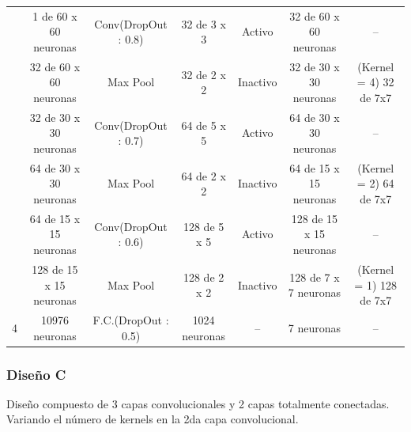 \begin{itemize}
\begin{table}[H]
\begin{center}
\begin{tabular}{|>{\scriptsize}c|>{\scriptsize}c>{\scriptsize}c>{\scriptsize}c>{\scriptsize}c>{\scriptsize}c|>{\scriptsize}c|}
				 & 1 de 60 x 60 neuronas & Conv(DropOut : 0.8) & 32 de 3 x 3 & Activo & 32 de 60 x 60 neuronas & --\\ 
				\multirow{-2}{*}{1} &  32 de 60 x 60 neuronas &  Max Pool &  32 de 2 x 2 &  Inactivo & 32 de 30 x 30 neuronas & {\cellcolor[HTML]{DAE8FC}(Kernel = 4) 32 de 7x7}\\ \hline
				 & 32 de 30 x 30 neuronas & Conv(DropOut : 0.7) & 64 de 5 x 5 & Activo & 64 de 30 x 30 neuronas & --\\ 
				\multirow{-2}{*}{2} &  64 de 30 x 30 neuronas &  Max Pool &  64 de 2 x 2 &  Inactivo & 64 de 15 x 15 neuronas & {\cellcolor[HTML]{DAE8FC}(Kernel = 2) 64 de 7x7}\\ \hline			
				{\cellcolor[HTML]{ffb3b3}} & 64 de 15 x 15 neuronas & Conv(DropOut : 0.6) & 128 de 5 x 5 & Activo & 128 de 15 x 15 neuronas & --\\ 			
				{\cellcolor[HTML]{ffb3b3} \multirow{-2}{*}{3}} &  128 de 15 x 15 neuronas &  Max Pool &  128 de 2 x 2 &  Inactivo & 128 de 7 x 7 neuronas & {\cellcolor[HTML]{DAE8FC} (Kernel = 1) 128 de 7x7 }\\ \hline
				4 &  {\cellcolor[HTML]{DAE8FC}10976 neuronas} &  F.C.(DropOut : 0.5) &  1024 neuronas &  -- & 7 neuronas & --\\ \hline
				\end{tabular}
				\end{center}
				\end{table}

				\end{itemize}
		\vspace{2.2em}
		\subsubsection{Diseño C} %
			\vspace{-1.2em}
			Diseño compuesto de 3 capas convolucionales y 2 capas totalmente conectadas. Variando el número de kernels en la 2da capa convolucional.
			
